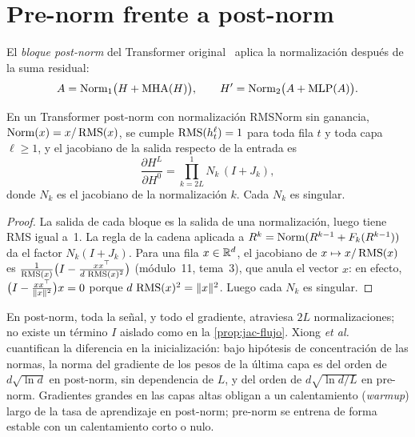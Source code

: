 \section{Pre-norm frente a post-norm}

\begin{definicion}\label{def:postnorm}
El \emph{bloque post-norm} del Transformer original~\cite[§3.1]{vaswani} aplica la normalización después de la suma residual:
\[
A=\operatorname{Norm}_1\bigl(H+\operatorname{MHA}(H)\bigr),\qquad H'=\operatorname{Norm}_2\bigl(A+\operatorname{MLP}(A)\bigr).
\]
\end{definicion}

\begin{proposicion}\label{prop:postnorm}
En un Transformer post-norm con normalización RMSNorm sin ganancia, $\operatorname{Norm}(x)=x/\operatorname{RMS}(x)$, se cumple $\operatorname{RMS}(h^{\ell}_t)=1$ para toda fila $t$ y toda capa $\ell\ge 1$, y el jacobiano de la salida respecto de la entrada es
\[
\frac{\partial H^{L}}{\partial H^{0}}=\prod_{k=2L}^{1}N_k\,(I+J_k),
\]
donde $N_k$ es el jacobiano de la normalización $k$. Cada $N_k$ es singular.
\end{proposicion}

\begin{proof}
La salida de cada bloque es la salida de una normalización, luego tiene RMS igual a~1. La regla de la cadena aplicada a $R^{k}=\operatorname{Norm}(R^{k-1}+F_k(R^{k-1}))$ da el factor $N_k(I+J_k)$. Para una fila $x\in\mathbb{R}^{d}$, el jacobiano de $x\mapsto x/\operatorname{RMS}(x)$ es $\frac{1}{\operatorname{RMS}(x)}\bigl(I-\frac{xx^{\top}}{d\,\operatorname{RMS}(x)^{2}}\bigr)$ (módulo~11, tema~3), que anula el vector $x$: en efecto, $\bigl(I-\frac{xx^{\top}}{\lVert x\rVert^{2}}\bigr)x=0$ porque $d\,\operatorname{RMS}(x)^{2}=\lVert x\rVert^{2}$. Luego cada $N_k$ es singular.
\end{proof}

En post-norm, toda la señal, y todo el gradiente, atraviesa $2L$ normalizaciones; no existe un término $I$ aislado como en la \cref{prop:jac-flujo}. Xiong \emph{et al.}~\cite[§3.3, teorema~1]{xiong} cuantifican la diferencia en la inicialización: bajo hipótesis de concentración de las normas, la norma del gradiente de los pesos de la última capa es del orden de $d\sqrt{\ln d}$ en post-norm, sin dependencia de $L$, y del orden de $d\sqrt{\ln d/L}$ en pre-norm. Gradientes grandes en las capas altas obligan a un calentamiento (\emph{warmup}) largo de la tasa de aprendizaje en post-norm; pre-norm se entrena de forma estable con un calentamiento corto o nulo.

